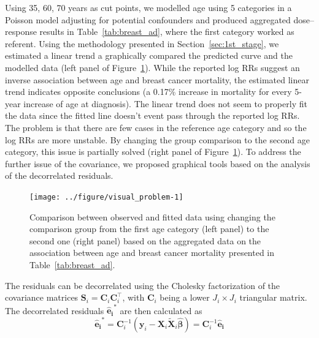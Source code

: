 \documentclass[11pt,a4paper,twoside,openany]{book}\usepackage{knitr}
\begin{document}
{Using 35, 60, 70 years as cut points, we modelled age using 5 categories in a Poisson model adjusting for potential confounders and produced aggregated dose--response results in Table~\ref{tab:breast_ad}, where the first category worked as referent. Using the methodology presented in Section~\ref{sec:1st_stage}, we estimated a linear trend a graphically compared the predicted curve and the modelled data (left panel of Figure~\ref{fig:visual_problem}). While the reported log RRs suggest an inverse association between age and breast cancer mortality, the estimated linear trend indicates opposite conclusions (a 0.17\% increase in mortality for every 5-year increase of age at diagnosis). The linear trend does not seem to properly fit the data since the fitted line doesn't event pass through the reported log RRs. The problem is that there are few cases in the reference age category and so the log RRs are more unstable. By changing the group comparison to the second age category, this issue is partially solved (right panel of Figure~\ref{fig:visual_problem}). To address the further issue of the covariance, we proposed graphical tools based on the analysis of the decorrelated residuals.

\begin{knitrout}\footnotesize
{}\color{fgcolor}\begin{figure}[ht!]

{\centering \texttt{[image: ../figure/visual\_problem-1]} 

}

\caption{Comparison between observed and fitted data using changing the comparison group from the first age category (left panel) to the second one (right panel) based on the aggregated data on the association between age and breast cancer mortality presented in Table~\ref{tab:breast_ad}.}\label{fig:visual_problem}
\end{figure}


\end{knitrout}

The residuals can be decorrelated using the Cholesky factorization of the covariance matrices $\mathbf{S}_i = \mathbf{C}_i\mathbf{C}_i^\top$, with $\mathbf{C}_i$ being a lower  $J_i \times J_i$ triangular matrix. The decorrelated residuals $\boldsymbol{\hat e_i}^*$ are then calculated as
\begin{equation}
\boldsymbol{\hat e_i}^* = \mathbf{C}_i^{-1} \left(\mathbf{y}_i - \mathbf{X}_i \widetilde{\mathbf{X}}_i \boldsymbol{\hat \beta} \right) = \mathbf{C}_i^{-1}\boldsymbol{\hat e_i}
\label{eq:decor_res}
\end{equation}

}
\end{document}
